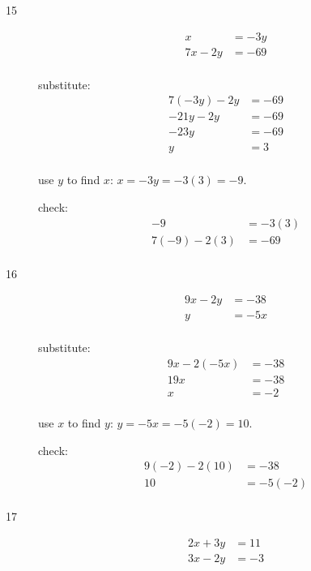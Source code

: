 \documentclass[fleqn,addpoints]{exam}
\begin{document}
\begin{description}

\item[15]
\begin{align*}
  x &= -3y \\
  7x-2y &= -69 \\
\end{align*}

substitute:
\begin{align*}
  7(-3y)-2y &= -69 \\
  -21y-2y &= -69 \\
  -23y &= -69 \\
  y &= 3 \\
\end{align*}

use $y$ to find $x$: $x = -3y = -3(3) = -9$.  

\vspace{0.2 cm}
\vspace{0.2 cm}

check:
\begin{align*}
  -9 &= -3(3) \\
  7(-9) - 2 (3) &= -69 \\
\end{align*}

\item[16]
\begin{align*}
  9x-2y &= -38 \\
  y &= -5x \\
\end{align*}

substitute:
\begin{align*}
  9x - 2(-5x) &= -38 \\
  19x &= -38 \\
  x &= -2 \\
\end{align*}

use $x$ to find $y$: $y = -5x = -5(-2) = 10$.  

\vspace{0.2 cm}
\vspace{0.2 cm}

check:
\begin{align*}
  9(-2)-2(10) &= -38 \\
  10 &= -5(-2) \\
\end{align*}

\item[17]
\begin{align*}
  2x+3y &= 11 \\
  3x-2y &= -3 \\
\end{align*}


\end{description}
\end{document}
